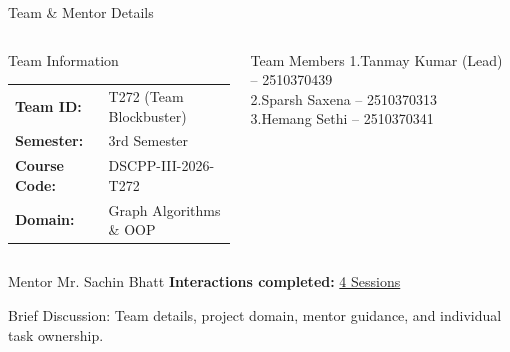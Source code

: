 \documentclass[aspectratio=169,11pt]{beamer}
\newcommand{\smallnote}[1]{%
\vspace{0.08cm}
{\scriptsize\color{GEUGrey}#1}
}
\begin{document}
\begin{frame}{Team \& Mentor Details}

\begin{columns}[T,totalwidth=\textwidth]


\begin{block}{Team Information}
\small
\begin{tabular}{@{}ll@{}}
\textbf{Team ID:} & T272 (Team Blockbuster)\\
\textbf{Semester:} & 3rd Semester\\
\textbf{Course Code:} & DSCPP-III-2026-T272\\
\textbf{Domain:} & Graph Algorithms \& OOP
\end{tabular}
\end{block}


\begin{block}{Team Members}
\small
1.\quad Tanmay Kumar (Lead) -- 2510370439\\
2.\quad Sparsh Saxena -- 2510370313\\
3.\quad Hemang Sethi -- 2510370341
\end{block}

\end{columns}

\vspace{2mm}

\begin{block}{Mentor}
Mr. Sachin Bhatt
\hfill
\textbf{Interactions completed:}
\underline{4 Sessions}
\end{block}

\vfill

\smallnote{
Brief Discussion: Team details, project domain, mentor guidance, and individual task ownership.
}

\end{frame}
\end{document}
